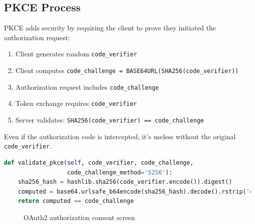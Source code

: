 \documentclass[12pt,a4paper]{article}
\begin{document}
\subsection{PKCE Process}

PKCE adds security by requiring the client to prove they initiated the authorization request:

\begin{enumerate}
    \item Client generates random \texttt{code\_verifier}
    \item Client computes \texttt{code\_challenge = BASE64URL(SHA256(code\_verifier))}
    \item Authorization request includes \texttt{code\_challenge}
    \item Token exchange requires \texttt{code\_verifier}
    \item Server validates: \texttt{SHA256(code\_verifier) == code\_challenge}
\end{enumerate}

Even if the authorization code is intercepted, it's useless without the original \texttt{code\_verifier}.

\begin{lstlisting}[language=Python, caption=PKCE Validation]
def validate_pkce(self, code_verifier, code_challenge,
                  code_challenge_method='S256'):
    sha256_hash = hashlib.sha256(code_verifier.encode()).digest()
    computed = base64.urlsafe_b64encode(sha256_hash).decode().rstrip('=')
    return computed == code_challenge
\end{lstlisting}

\begin{figure}[H]
    \centering
    \caption{OAuth2 authorization consent screen}
    \label{fig:oauth_consent}
\end{figure}
\end{document}
